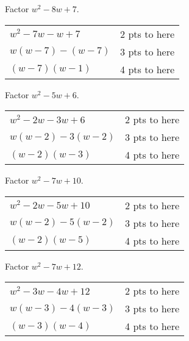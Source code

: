 {
	Factor $w^2-8w+7$.
}
{
	\begin{tabular}{l r}
	$w^2-7w-w+7$ & 2 pts to here\\
	$w(w-7)-(w-7)$ & 3 pts to here\\
	$(w-7)(w-1)$ & 4 pts to here
	\end{tabular}
}

{
	Factor $w^2-5w+6$.
}
{
	\begin{tabular}{l r}
	$w^2-2w-3w+6$ & 2 pts to here\\
	$w(w-2)-3(w-2)$ & 3 pts to here\\
	$(w-2)(w-3)$ & 4 pts to here
	\end{tabular}
}


{
	Factor $w^2-7w+10$.
}
{
	\begin{tabular}{l r}
	$w^2-2w-5w+10$ & 2 pts to here\\
	$w(w-2)-5(w-2)$ & 3 pts to here\\
	$(w-2)(w-5)$ & 4 pts to here
	\end{tabular}
}


{
	Factor $w^2-7w+12$.
}
{
	\begin{tabular}{l r}
	$w^2-3w-4w+12$ & 2 pts to here\\
	$w(w-3)-4(w-3)$ & 3 pts to here\\
	$(w-3)(w-4)$ & 4 pts to here
	\end{tabular}
}


